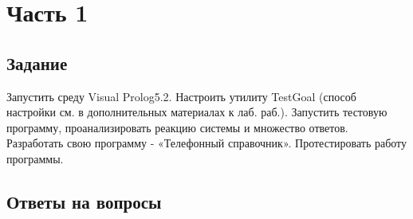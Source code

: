 \documentclass[14pt,a4paper]{scrreprt}
\begin{document}


\thispagestyle{empty}

\chapter{Часть 1}

\section{Задание}

Запустить среду Visual Prolog5.2. Настроить утилиту TestGoal (способ настройки см. в
дополнительных материалах к лаб. раб.). Запустить тестовую программу, проанализировать
реакцию системы и множество ответов. Разработать свою программу - «Телефонный
справочник». Протестировать работу программы.

\section{Ответы на вопросы}
\end{document}
